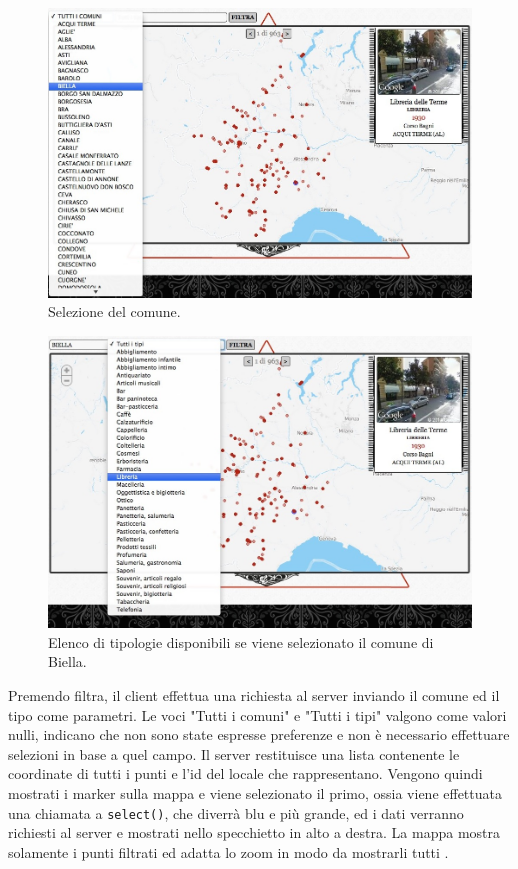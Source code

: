 \begin{figure}[ht!]
	\centering
		\includegraphics[width=\textwidth]{img/s3.jpg}
	\caption{Selezione del comune.}
	\label{fig:comuni}
\end{figure}

\begin{figure}[ht!]
	\centering
		\includegraphics[width=\textwidth]{img/s4.jpg}
	\caption{Elenco di tipologie disponibili se viene selezionato il comune di Biella.}
	\label{fig:tipitipi}
\end{figure}

Premendo filtra, il client effettua una richiesta al server inviando il comune ed il tipo come parametri. Le voci "Tutti i comuni" e "Tutti i tipi" valgono come valori nulli, indicano che non sono state espresse preferenze e non è necessario effettuare selezioni in base a quel campo. Il server restituisce una lista contenente le coordinate di tutti i punti e l'id del locale che rappresentano. Vengono quindi mostrati i marker sulla mappa e viene selezionato il primo, ossia viene effettuata una chiamata a \texttt{select()}, che diverrà blu e più grande, ed i dati verranno richiesti al server e mostrati nello specchietto in alto a destra. La mappa mostra solamente i punti filtrati ed adatta lo zoom in modo da mostrarli tutti .

